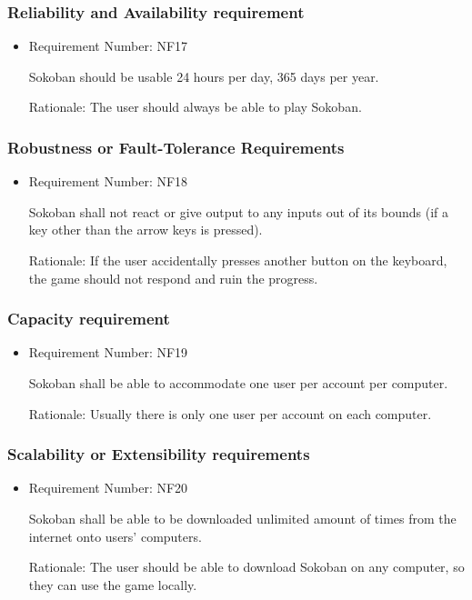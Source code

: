 \documentclass[12pt, titlepage]{article}
\begin{document}
\subsubsection{Reliability and Availability requirement}
\begin{itemize}
    \item Requirement Number: NF17
    
Sokoban should be usable 24 hours per day, 365 days per year.
     
    Rationale: The user should always be able to play Sokoban.
\end{itemize}


\subsubsection{Robustness or Fault-Tolerance Requirements}

\begin{itemize}
    \item Requirement Number: NF18
    
Sokoban shall not react or give output to any inputs out of its bounds (if a key other than the arrow keys is pressed).
     
    Rationale: If the user accidentally presses another button on the keyboard, the game should not respond and ruin the progress.
\end{itemize}


\subsubsection{Capacity requirement}

\begin{itemize}
    \item Requirement Number: NF19
    
Sokoban shall be able to accommodate one user per account per computer.  
     
    Rationale: Usually there is only one user per account on each computer.
\end{itemize}


\subsubsection{Scalability or Extensibility requirements}

\begin{itemize}
    \item Requirement Number: NF20
    
Sokoban shall be able to be downloaded unlimited amount of times from the internet onto users' computers.
     
    Rationale: The user should be able to download Sokoban on any computer, so they can use the game locally.
\end{itemize}
\end{document}
